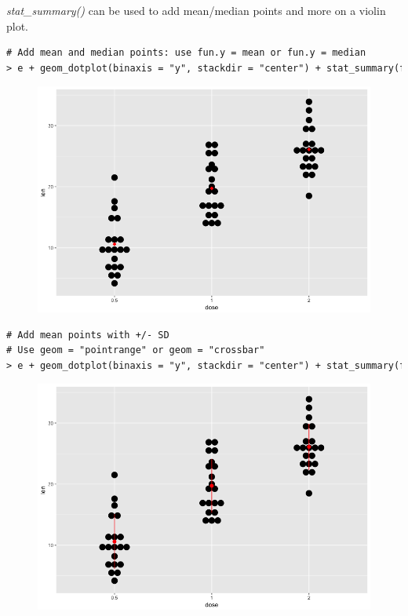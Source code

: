 \textit{stat\_summary()} can be used to add mean/median points and more on a violin plot.
\begin{lstlisting}[language=html]
# Add mean and median points: use fun.y = mean or fun.y = median
> e + geom_dotplot(binaxis = "y", stackdir = "center") + stat_summary(fun.y = mean, geom = "point", shape = 18, size = 3, color = "red")
\end{lstlisting}
\begin{figure}[H]\begin{center}\includegraphics[scale=1 ]{ilu/bg103.png}\end{center}\end{figure}
\begin{lstlisting}[language=html]
# Add mean points with +/- SD
# Use geom = "pointrange" or geom = "crossbar"
> e + geom_dotplot(binaxis = "y", stackdir = "center") + stat_summary(fun.data = "mean_sdl", fun.args = list(mult = 1), geom = "pointrange", color = "red")
\end{lstlisting}
\begin{figure}[H]\begin{center}\includegraphics[scale=1 ]{ilu/bg104.png}\end{center}\end{figure}

